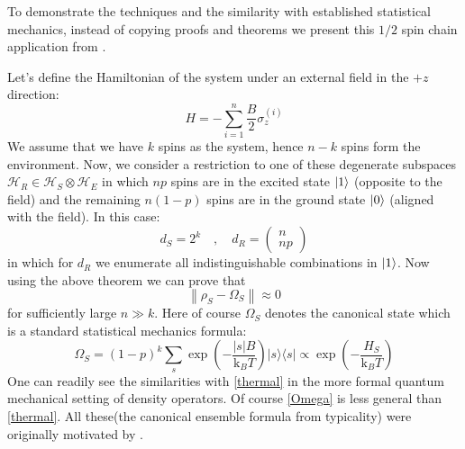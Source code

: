 \documentclass[a4paper,12pt]{article}
\begin{document}
To demonstrate the techniques and the similarity with established statistical mechanics, instead of copying proofs and theorems we present this $1/2$ spin chain application from \cite{popescu2006entanglement}.
\par Let's define the Hamiltonian of the system under an external field in the $+z$ direction:
\begin{equation}
H=-\sum_{i=1}^{n} \frac{B}{2} \sigma_{z}^{(i)}
\end{equation}
We assume that we have $k$ spins as the system, hence $n-k$ spins form the environment. Now, we consider a restriction to one of these degenerate subspaces $\mathcal{H}_{R} \in \mathcal{H}_{S} \otimes \mathcal{H}_{E}$ in which $n p$ spins are in the excited state $\ket{1}$ (opposite to the field) and the remaining $n(1-p)$ spins are in the ground state
$\ket{0}$ (aligned with the field). In this case:
\begin{equation}
d_{S}=2^k \quad , \quad
d_{R}=\left(\begin{array}{c}
n \\
n p
\end{array}\right)
\end{equation}
in which for $d_{R}$ we enumerate all indistinguishable combinations in $\ket{1}$. Now using the above theorem we can prove that
\begin{equation}
\left\|\rho_{S}-\Omega_{S}\right\| \approx 0
\end{equation}
for sufficiently large $n \gg k$. Here of course $\Omega_{S}$ denotes the canonical state which is a standard statistical mechanics formula:
\begin{equation}
\Omega_{S}=(1-p)^{k} \sum_{s} \exp \left(-\frac{|s| B}{\mathrm{k}_{B} T}\right)|s\rangle\langle s|
\propto \exp \left(-\frac{H_{S}}{\mathrm{k}_{B} T}\right)
\label{Omega}
\end{equation}
One can readily see the similarities with \eqref{thermal} in the more formal quantum mechanical setting of density operators. Of course \eqref{Omega} is less general than \eqref{thermal}. All these(the canonical ensemble formula from typicality) were originally motivated by \cite{goldstein2006canonical}.
\end{document}
